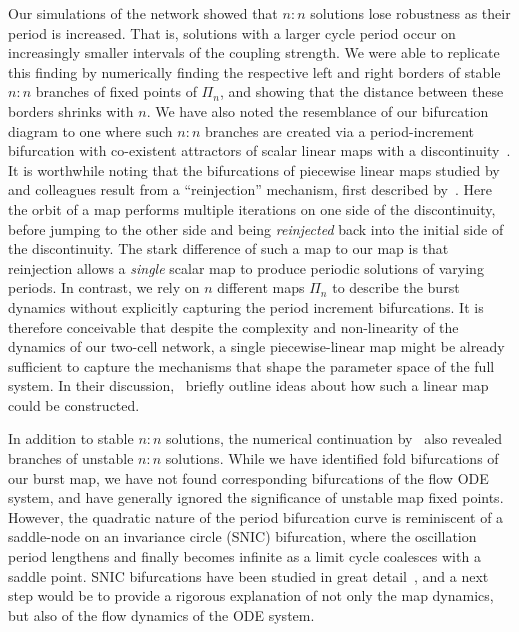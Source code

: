Our simulations of the network showed that $n:n$ solutions lose robustness as their period is increased. That is, solutions with a larger cycle period occur on increasingly smaller intervals of the coupling strength. We were able to replicate this finding by numerically finding the respective left and right borders of stable $n:n$ branches of fixed points of $\Pi_n$, and showing that the distance between these borders shrinks with $n$. We have also noted the resemblance of our bifurcation diagram to one where such $n:n$ branches are created via a period-increment bifurcation with co-existent attractors of scalar linear maps with a discontinuity~\citep{avrutin2012,avrutin2011}. It is worthwhile noting that the bifurcations of piecewise linear maps studied by~\citeauthor{avrutin2012} and colleagues result from a ``reinjection'' mechanism, first described by~\citet{perez1985}. Here the orbit of a map performs multiple iterations on one side of the discontinuity, before jumping to the other side and being \textit{reinjected} back into the initial side of the discontinuity. The stark difference of such a map to our map is that reinjection allows a \emph{single} scalar map to produce periodic solutions of varying periods. In contrast, we rely on $n$ different maps $\Pi_n$ to describe the burst dynamics without explicitly capturing the period increment bifurcations. It is therefore conceivable that despite the complexity and non-linearity of the dynamics of our two-cell network, a single piecewise-linear map might be already sufficient to capture the mechanisms that shape the parameter space of the full system. In their discussion,~\citet{bose2011} briefly outline ideas about how such a linear map could be constructed.

In addition to stable $n:n$ solutions, the numerical continuation by~\citet{bose2011} also revealed branches of unstable $n:n$ solutions. While we have identified fold bifurcations of our burst map, we have not found corresponding bifurcations of the flow ODE system, and have generally ignored the significance of unstable map fixed points. However, the quadratic nature of the period bifurcation curve is reminiscent of a saddle-node on an invariance circle (SNIC) bifurcation, where the oscillation period lengthens and finally becomes infinite as a limit cycle coalesces with a saddle point.
SNIC bifurcations have been studied in great detail~\cite[e.g.][]{ermentrout1986}, and a next step would be to provide a rigorous explanation of not only the map dynamics, but also of the flow dynamics of the ODE system.

